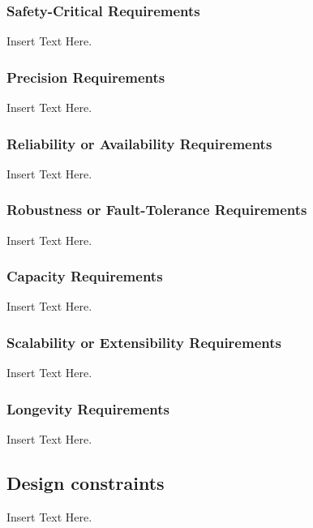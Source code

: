 \documentclass [12pt]{article}
\begin{document}
\subsubsection{Safety-Critical Requirements }
Insert Text Here.

\subsubsection{Precision Requirements}
Insert Text Here.

\subsubsection{Reliability or Availability  Requirements}
Insert Text Here.

\subsubsection{Robustness or Fault-Tolerance Requirements }
Insert Text Here.

\subsubsection{Capacity Requirements }
Insert Text Here.

\subsubsection{Scalability or Extensibility Requirements }
Insert Text Here.

\subsubsection{Longevity Requirements }Insert Text Here.

\subsection{Design constraints} 
Insert Text Here.
\end{document}
